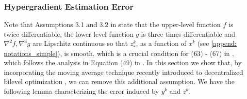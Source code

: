\documentclass[10pt]{article}
\theoremstyle{remark}
\begin{document}
\subsubsection{Hypergradient Estimation Error}
Note that Assumptions 3.1 and 3.2 in \cite{dagreou2022framework} state that the upper-level function $f$ is twice differentiable, the lower-level function $g$ is three times differentiable and $\nabla^2f, \nabla^3g$ are Lipschitz continuous so that $z_*^k$, as a function of $x^k$ (see \eqref{append: notations_simple}), is smooth, which is a crucial condition for (63) - (67) in \cite{dagreou2022framework}, which follows the analysis in Equation (49) in \cite{chen2021closing}. In this section we show that, by incorporating the moving average technique recently introduced to decentralized bilevel optimization \cite{chen2022decentralizeddsbo}, we can remove this additional assumption. We have the following lemma characterizing the error induced by $y^k$ and $z^k$.
\end{document}
